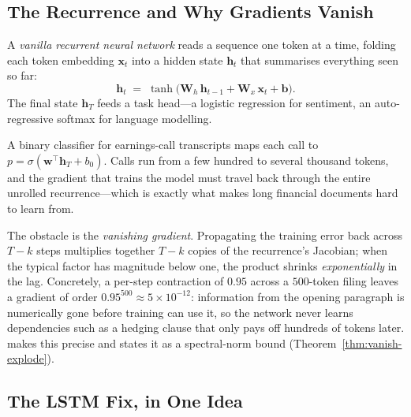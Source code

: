 \begin{deepdive}

\subsection{The Recurrence and Why Gradients Vanish}
\label{sec:rnn-vanilla}

A \emph{vanilla recurrent neural network} reads a sequence one token at a
time, folding each token embedding $\mathbf{x}_t$ into a hidden state
$\mathbf{h}_t$ that summarises everything seen so far:
\[
  \mathbf{h}_t
  \;=\;
  \tanh\!\bigl(\mathbf{W}_h\,\mathbf{h}_{t-1}
               + \mathbf{W}_x\,\mathbf{x}_t
               + \mathbf{b}\bigr).
\]
The final state $\mathbf{h}_T$ feeds a task head---a logistic regression
for sentiment, an auto-regressive softmax for language modelling.

\begin{example}
\label{ex:rnn-earnings}
A binary classifier for earnings-call transcripts maps each call to
$p = \sigma(\mathbf{w}^{\top}\mathbf{h}_T + b_0)$.  Calls run from a few
hundred to several thousand tokens, and the gradient that trains the model
must travel back through the entire unrolled recurrence---which is exactly
what makes long financial documents hard to learn from.
\end{example}

The obstacle is the \emph{vanishing gradient}.  Propagating the training
error back across $T-k$ steps multiplies together $T-k$ copies of the
recurrence's Jacobian; when the typical factor has magnitude below one,
the product shrinks \emph{exponentially} in the lag.  Concretely, a
per-step contraction of $0.95$ across a $500$-token filing leaves a
gradient of order $0.95^{500}\approx 5\times10^{-12}$: information from the
opening paragraph is numerically gone before training can use it, so the
network never learns dependencies such as a hedging clause that only pays
off hundreds of tokens later.   makes this
precise and states it as a spectral-norm bound
(Theorem~\ref{thm:vanish-explode}).

\subsection{The LSTM Fix, in One Idea}
\label{sec:lstm}


\end{deepdive}
